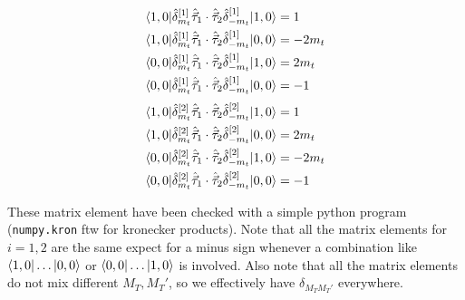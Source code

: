 \documentclass[10pt]{article}
\begin{document}
\begin{multicols}{2}
\noindent
\begin{align*}
	\braket{ 1,0 | \hat{\delta}_{m_t}^{[1]}  \hat{\vec{\tau}}_{1} \cdot \hat{\vec{\tau}}_{2} \hat{\delta}_{-m_t}^{[1]} | 1,0 } &= 1 \\
	\braket{ 1,0 | \hat{\delta}_{m_t}^{[1]}  \hat{\vec{\tau}}_{1} \cdot \hat{\vec{\tau}}_{2} \hat{\delta}_{-m_t}^{[1]} | 0,0 } &= -2m_t \\
	\braket{ 0,0 | \hat{\delta}_{m_t}^{[1]}  \hat{\vec{\tau}}_{1} \cdot \hat{\vec{\tau}}_{2} \hat{\delta}_{-m_t}^{[1]} | 1,0 } &= 2m_t \\
	\braket{ 0,0 | \hat{\delta}_{m_t}^{[1]}  \hat{\vec{\tau}}_{1} \cdot \hat{\vec{\tau}}_{2} \hat{\delta}_{-m_t}^{[1]} | 0,0 } &= -1
\end{align*}
\begin{align*}
	\braket{ 1,0 | \hat{\delta}_{m_t}^{[2]}  \hat{\vec{\tau}}_{1} \cdot \hat{\vec{\tau}}_{2} \hat{\delta}_{-m_t}^{[2]} | 1,0 } &= 1 \\
	\braket{ 1,0 | \hat{\delta}_{m_t}^{[2]}  \hat{\vec{\tau}}_{1} \cdot \hat{\vec{\tau}}_{2} \hat{\delta}_{-m_t}^{[2]} | 0,0 } &= 2m_t \\
	\braket{ 0,0 | \hat{\delta}_{m_t}^{[2]}  \hat{\vec{\tau}}_{1} \cdot \hat{\vec{\tau}}_{2} \hat{\delta}_{-m_t}^{[2]} | 1,0 } &=-2m_t \\
	\braket{ 0,0 | \hat{\delta}_{m_t}^{[2]}  \hat{\vec{\tau}}_{1} \cdot \hat{\vec{\tau}}_{2} \hat{\delta}_{-m_t}^{[2]} | 0,0 } &= -1
\end{align*}
\end{multicols}
These matrix element have been checked with a simple python program (\texttt{numpy.kron} ftw for kronecker products). Note that all the matrix elements for $i=1,2$ are the same expect for a minus sign whenever a combination like $ \braket{ 1,0 | \ldots | 0,0}$ or $\braket{0,0| \ldots | 1,0}$ is involved.
Also note that all the matrix elements do not mix different $M_T, M_T'$, so we effectively have $\delta_{M_T M_T'}$ everywhere.
\end{document}
